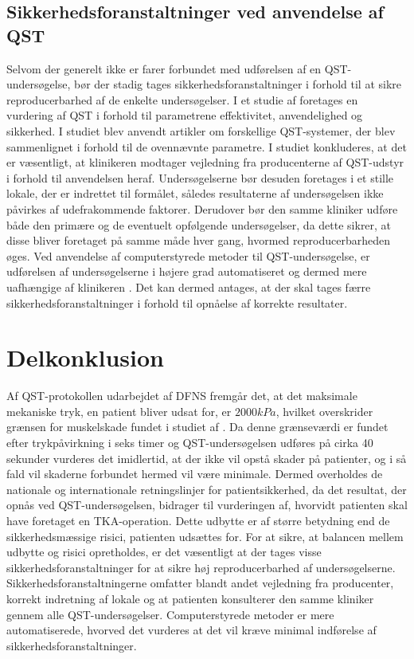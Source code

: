 \subsection{Sikkerhedsforanstaltninger ved anvendelse af QST}
Selvom der generelt ikke er farer forbundet med udførelsen af en QST-undersøgelse, bør der stadig tages sikkerhedsforanstaltninger i forhold til at sikre reproducerbarhed af de enkelte undersøgelser. I et studie af  foretages en vurdering af QST i forhold til parametrene effektivitet, anvendelighed og sikkerhed. I studiet blev anvendt artikler om forskellige QST-systemer, der blev sammenlignet i forhold til de ovennævnte parametre. I studiet konkluderes, at det er væsentligt, at klinikeren modtager vejledning fra producenterne af QST-udstyr i forhold til anvendelsen heraf. Undersøgelserne bør desuden foretages i et stille lokale, der er indrettet til formålet, således resultaterne af undersøgelsen ikke påvirkes af udefrakommende faktorer. Derudover bør den samme kliniker udføre både den primære og de eventuelt opfølgende undersøgelser, da dette sikrer, at disse bliver foretaget på samme måde hver gang, hvormed reproducerbarheden øges. \citep{shy2003}
Ved anvendelse af computerstyrede metoder til QST-undersøgelse, er udførelsen af undersøgelserne i højere grad automatiseret og dermed mere uafhængige af klinikeren \citep{Nielsen2015}. Det kan dermed antages, at der skal tages færre sikkerhedsforanstaltninger i forhold til opnåelse af korrekte resultater.  

\section{Delkonklusion}
Af QST-protokollen udarbejdet af DFNS fremgår det, at det maksimale mekaniske tryk, en patient bliver udsat for, er $2000 kPa$, hvilket overskrider grænsen for muskelskade fundet i studiet af . Da denne grænseværdi er fundet efter trykpåvirkning i seks timer og QST-undersøgelsen udføres på cirka 40 sekunder vurderes det imidlertid, at der ikke vil opstå skader på patienter, og i så fald vil skaderne forbundet hermed vil være minimale. Dermed overholdes de nationale og internationale retningslinjer for patientsikkerhed, da det resultat, der opnås ved QST-undersøgelsen, bidrager til vurderingen af, hvorvidt patienten skal have foretaget en TKA-operation. Dette udbytte er af større betydning end de sikkerhedsmæssige risici, patienten udsættes for.
For at sikre, at balancen mellem udbytte og risici opretholdes, er det væsentligt at der tages visse sikkerhedsforanstaltninger for at sikre høj reproducerbarhed af undersøgelserne. Sikkerhedsforanstaltningerne omfatter blandt andet vejledning fra producenter, korrekt indretning af lokale og at patienten konsulterer den samme kliniker gennem alle QST-undersøgelser. Computerstyrede metoder er mere automatiserede, hvorved det vurderes at det vil kræve minimal indførelse af sikkerhedsforanstaltninger.


